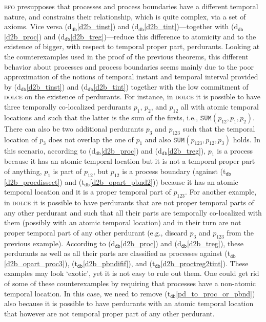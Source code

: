 \documentclass[ao]{iosart2x}
\newcommand{\dbDefLabel}{\textrm{d$_\texttt{db}$}}
\newcommand{\dbThrLabel}{\textrm{t$_\texttt{db}$}}
\newcommand{\refdbdf}[1]{({\dbDefLabel}\ref{#1})}
\newcommand{\refdbth}[1]{({\dbThrLabel}\ref{#1})}
\newcommand{\pr}[1]{\mathtt{#1}}
\newcommand{\dolce}{{\textsc{dolce}}}
\newcommand{\bfo}{{\textsc{bfo}}}
\newcommand {\SUMd} {\ensuremath{\pr{SUM}}}
\begin{document}
{\bfo} presupposes that processes and process boundaries have a different temporal nature, and constrains their relationship, which is quite complex, via a set of axioms. Vice versa \refdbdf{d2b_tinst} and \refdbdf{d2b_tint}---together with \refdbdf{d2b_proc} and \refdbdf{d2b_treg}---reduce this difference to atomicity and to the existence of bigger, with respect to temporal proper part, perdurants. Looking at the counterexamples used in the proof of the previous theorems, this different behavior about processes and process boundaries seems mainly due to the poor approximation of the notions of temporal instant and temporal interval provided by \refdbdf{d2b_tinst} and \refdbdf{d2b_tint} together with the low commitment of {\dolce} on the existence of perdurants.  For instance, in {\dolce} it is possible to have three temporally co-localized perdurants $p_1$, $p_2$, and $p_{12}$ all with atomic temporal locations and such that  the latter is the sum of the firsts, i.e., $\SUMd(p_{12}, p_1,p_2)$. There can also be two additional perdurants $p_3$ and $p_{123}$ such that the temporal location of $p_3$ does not overlap the one of $p_1$ and also $\SUMd(p_{123}, p_{12},p_3)$ holds. In this scenario, according to \refdbdf{d2b_proc} and \refdbdf{d2b_treg}, $p_{1}$ is a process because it has an atomic temporal location but it is not a temporal proper part of anything, $p_1$ is part of $p_{12}$, but $p_{12}$ is a process boundary  (against \refdbth{d2b_procdissect} and \refdbth{d2b_opart_pbnd2}) because it has an atomic temporal location and it is a proper temporal part of $p_{123}$. For another example, in {\dolce} it is possible to have perdurants that are not proper temporal parts of any other perdurant and such that all their parts are temporally co-localized with them (possibly with an atomic temporal location) and in their turn are not proper temporal part of any other perdurant (e.g., discard $p_3$ and $p_{123}$ from the previous example). According to \refdbdf{d2b_proc} and \refdbdf{d2b_treg}, these perdurants as well as all their parts are classified as processes against \refdbth{d2b_opart_proc3}, \refdbth{d2b_pbndifif}, and \refdbth{d2b_proctreg2tint}. These examples may look `exotic', yet it is not easy to rule out them. One could get rid of some of these counterexamples by requiring that processes have a non-atomic temporal location. In this case, we need to remove \refdbth{pd_to_proc_or_pbnd} also because it is possible to have perdurants with an atomic temporal location that however are not temporal proper part of any other perdurant. 
\end{document}
